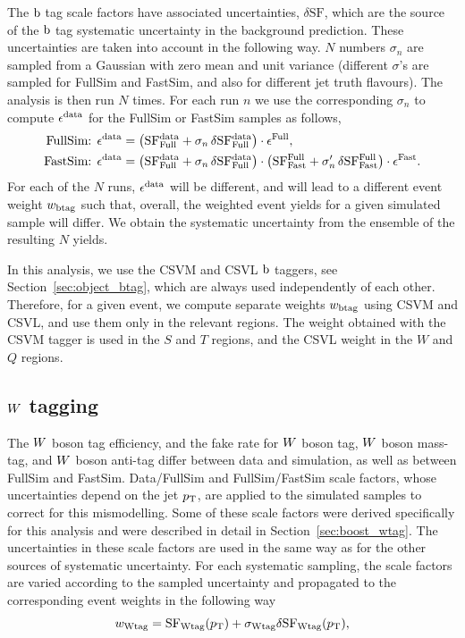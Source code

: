 The $\mathrm{b}$ tag scale factors have associated uncertainties, $\delta\mathrm{SF}$, which are the
source of the $\mathrm{b}$ tag systematic uncertainty in the background prediction. 
These uncertainties are taken into account in the following way.
$N$ numbers $\sigma_n$ are sampled from a Gaussian with zero mean and unit variance
(different $\sigma$'s are sampled for FullSim and FastSim, and also for different jet truth
flavours). The analysis is then run $N$ times. For each run $n$ we use the corresponding $\sigma_n$
to compute $\epsilon^{\rm data}$ for the FullSim or FastSim samples as follows, 
\begin{align}
\textrm{FullSim: } \epsilon^{\rm data} &= \left(\mathrm{SF^{data}_{Full}} + \sigma_n \, \delta
\mathrm{SF^{data}_{Full}} \right) \cdot \epsilon^{\rm Full} , \\
\textrm{FastSim: } \epsilon^{\rm data} &= \left(\mathrm{SF^{data}_{Full}} + \sigma_n \, \delta
\mathrm{SF^{data}_{Full}}\right) \cdot \left(\mathrm{SF^{Full}_{Fast}} + \sigma_n' \, \delta
\mathrm{SF^{Full}_{Fast}} \right) \cdot \epsilon^{\rm Fast}.
\end{align}
For each of the $N$ runs, $\epsilon^{\rm data}$ will be different, and will lead to a different
event weight $w_{\rm btag}$ such that, overall, the weighted event yields for a given simulated
sample will differ. 
We obtain the systematic uncertainty from the ensemble of the resulting $N$ yields.

In this analysis, we use the CSVM and CSVL $\mathrm{b}$ taggers, see Section~\ref{sec:object_btag}, which
are always used independently of each other. Therefore, for a given event, we compute separate
weights
$w_{\rm btag}$ using CSVM and CSVL, and use them only in the relevant regions. The weight obtained
with the CSVM tagger is used in the $S$ and $T$ regions, and the CSVL weight in the $W$ and $Q$
regions.

\subsection{\texorpdfstring{$W$}{W} tagging} 

The $W$ boson tag efficiency, and the fake rate for $W$ boson tag, $W$ boson mass-tag, and $W$
boson anti-tag differ between data and simulation, as well as between FullSim and FastSim. 
Data/FullSim and FullSim/FastSim scale factors, whose uncertainties depend on the jet $p_{\mathrm{T}}$,
are applied to the simulated samples to correct for this mismodelling.
Some of these scale factors were derived specifically for this analysis and were described in detail
in Section~\ref{sec:boost_wtag}.
The uncertainties in these scale factors are used in the same way as for the other sources of
systematic uncertainty. For each systematic sampling, the scale factors are varied according to the
sampled uncertainty and propagated to the corresponding event weights in the following way
\begin{equation}
w_{\rm Wtag} = {\rm SF_{Wtag}}(p_{\mathrm{T}}) + \sigma_{\rm Wtag} \delta {\rm SF_{Wtag}}(p_{\mathrm{T}}), 
\end{equation}

